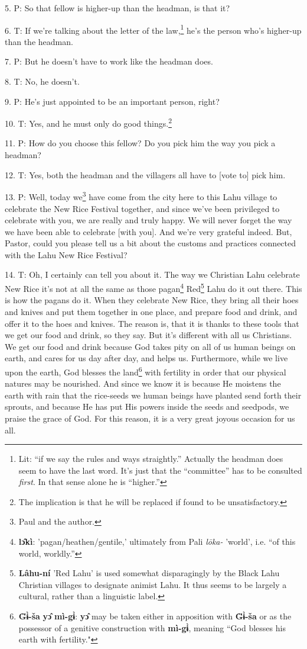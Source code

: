 5. P: So that fellow is higher-up than the headman, is that it?

6. T: If we're talking about the letter of the law,\footnote{Lit: ``if we say the rules and ways straightly.'' Actually the headman does seem to have the last word. It's just that the ``committee'' has to be consulted \textit{first}. In that sense alone he is ``higher.''} he's the person who's higher-up
than the headman.

7. P: But he doesn't have to work like the headman does.

8. T: No, he doesn't.

9. P: He's just appointed to be an important person, right?

10. T: Yes, and he must only do good things.\footnote{The implication is that he will be replaced if found to be unsatisfactory.}

11. P: How do you choose this fellow? Do you pick him the way you pick a headman?

12. T: Yes, both the headman and the villagers all have to [vote to] pick him.

13. P:  Well, today we\footnote{Paul and the author.} have come from
the city here to this Lahu village to celebrate the New Rice Festival together,
and since we've been privileged to celebrate with you, we are really and truly
happy. We will never forget the way we have been able to celebrate [with you].
And we're very grateful indeed. But, Pastor, could you please tell us a bit about
the customs and practices connected with the Lahu New Rice Festival?

14. T: Oh, I certainly can tell you about it. The way we Christian Lahu celebrate
New Rice it's not at all the same as those pagan\footnote{\textbf{lɔ̂kì}: 'pagan/heathen/gentile,' ultimately from Pali \textit{lōka-} 'world', i.e. ``of this world, worldly.''} Red\footnote{\textbf{Lâhu-ní} 'Red Lahu' is used somewhat disparagingly by the Black Lahu Christian villages to designate animist Lahu. It thus seems to be largely a cultural, rather than a linguistic label.} Lahu do it out there.
This is how the pagans do it. When they celebrate New Rice, they bring all their
hoes and knives and put them together in one place, and prepare food and drink,
and offer it to the hoes and knives. The reason is, that it is thanks to these
tools that we get our food and drink, so they say. But it's different with all
us Christians. We get our food and drink because God takes pity on all of us human
beings on earth, and cares for us day after day, and helps us. Furthermore, while
we live upon the earth, God blesses the land\footnote{\textbf{G̈ɨ̀-ša} \textbf{yɔ̂} \textbf{mì-gɨ̀}: \textbf{yɔ̂} may be taken either in apposition with \textbf{G̈ɨ̀-ša} or as the possessor of a genitive construction with \textbf{mì-gɨ̀}, meaning ``God blesses his earth with fertility."} with fertility in order that our
physical natures may be nourished. And since we know it is because He moistens
the earth with rain that the rice-seeds we human beings have planted send forth
their sprouts, and because He has put His powers inside the seeds and seedpods,
we praise the grace of God. For this reason, it is a very great joyous occasion
for us all.

